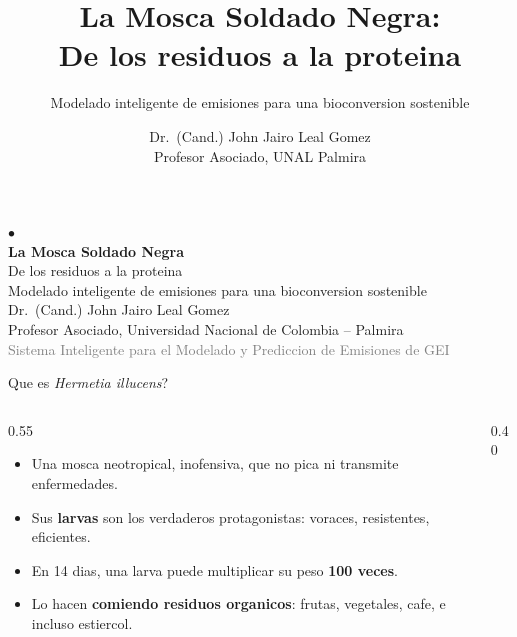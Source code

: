 \documentclass[aspectratio=169,11pt]{beamer}
\title{\textbf{La Mosca Soldado Negra:}\\De los residuos a la proteina}
\subtitle{Modelado inteligente de emisiones para una bioconversion sostenible}
\author{Dr.~(Cand.) John Jairo Leal Gomez\\{\small Profesor Asociado, UNAL Palmira}}
\date{}
\begin{document}
\begin{frame}
  \vspace{1cm}
  \centering
  {\Huge\textcolor{verdehoja}{$\bullet$}}\\[0.3cm]
  {\LARGE\textbf{La Mosca Soldado Negra}}\\[0.2cm]
  {\large De los residuos a la proteina}\\[0.5cm]
  {\normalsize\textcolor{marronlarva}{Modelado inteligente de emisiones para una bioconversion sostenible}}\\[1cm]
  {\small Dr.~(Cand.) John Jairo Leal Gomez}\\[0.1cm]
  {\footnotesize Profesor Asociado, Universidad Nacional de Colombia -- Palmira}\\[0.3cm]
  {\footnotesize\textcolor{gray}{Sistema Inteligente para el Modelado y Prediccion de Emisiones de GEI}}
\end{frame}

\begin{frame}{Que es \textit{Hermetia illucens}?}
  \begin{columns}
    \begin{column}{0.55\textwidth}
      \begin{itemize}
        \item Una mosca neotropical, inofensiva, que no pica ni transmite enfermedades.
        \item Sus \textbf{larvas} son los verdaderos protagonistas: voraces, resistentes, eficientes.
        \item En 14 dias, una larva puede multiplicar su peso \textbf{100 veces}.
        \item Lo hacen \textbf{comiendo residuos organicos}: frutas, vegetales, cafe, e incluso estiercol.
      \end{itemize}
    \end{column}
    \begin{column}{0.40\textwidth}
      \centering
    \end{column}
  \end{columns}
\end{frame}
\end{document}
